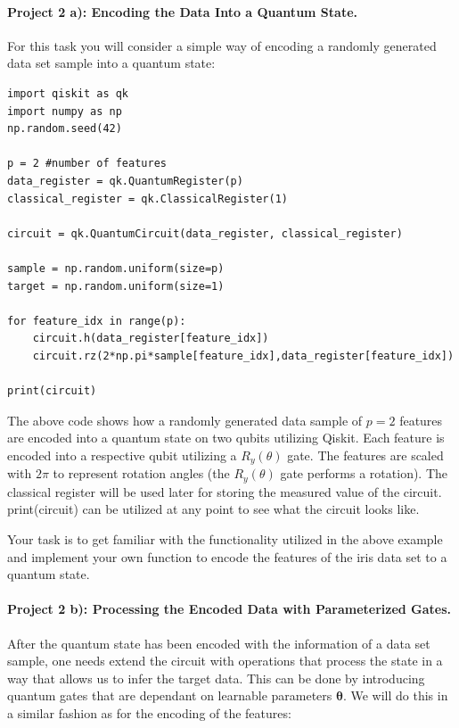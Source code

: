 \documentclass[%
oneside,                 %
final,                   %
10pt]{article}
\begin{document}
\paragraph{Project 2 a): Encoding the Data Into a Quantum State.}
For this task you will consider a simple way of encoding a randomly generated data set sample into a quantum state:




















\begin{verbatim}
import qiskit as qk
import numpy as np
np.random.seed(42)

p = 2 #number of features
data_register = qk.QuantumRegister(p)
classical_register = qk.ClassicalRegister(1)

circuit = qk.QuantumCircuit(data_register, classical_register)

sample = np.random.uniform(size=p)
target = np.random.uniform(size=1)

for feature_idx in range(p):
    circuit.h(data_register[feature_idx])
    circuit.rz(2*np.pi*sample[feature_idx],data_register[feature_idx])

print(circuit)

\end{verbatim}


The above code shows how a randomly generated data sample of $p=2$
features are encoded into a quantum state on two qubits utilizing
Qiskit. Each feature is encoded into a respective qubit utilizing a
$R_y(\theta)$ gate. The features are scaled with $2\pi$ to represent
rotation angles (the $R_y(\theta)$ gate performs a rotation). The
classical register will be used later for storing the measured value
of the circuit.  print(circuit) can be utilized at any point to see
what the circuit looks like.

Your task is to get familiar with the functionality utilized in the
above example and implement your own function to encode the
features of the iris data set to a quantum state.

\paragraph{Project 2 b): Processing the Encoded Data with Parameterized Gates.}
After the quantum state has been encoded with the information of a data set sample, one needs extend the circuit with operations that process the state in a way that allows us to infer the target data. This can be done by introducing quantum gates that are dependant on learnable parameters $\boldsymbol{\theta}$. We will do this in a similar fashion as for the encoding of the features:
\end{document}
